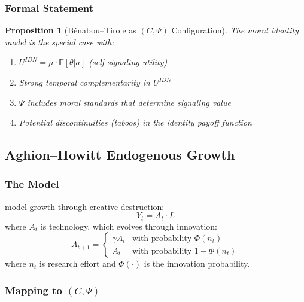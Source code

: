 \documentclass[12pt,a4paper]{article}
\newtheorem{proposition}[theorem]{Proposition}
\begin{document}
\subsubsection{Formal Statement}

\begin{proposition}[Bénabou--Tirole as $(C, \Psi)$ Configuration]
The moral identity model is the special case with:
\begin{enumerate}
  \item $U^{IDN} = \mu \cdot \mathbb{E}[\theta | a]$ (self-signaling utility)
  \item Strong temporal complementarity in $U^{IDN}$
  \item $\Psi$ includes moral standards that determine signaling value
  \item Potential discontinuities (taboos) in the identity payoff function
\end{enumerate}
\end{proposition}

\subsection{Aghion--Howitt Endogenous Growth}
\label{app:aghionhowitt}

\subsubsection{The Model}

\citet{aghionhowitt} model growth through creative destruction:
\begin{equation}
  Y_t = A_t \cdot L
  \label{eq:ahproduction}
\end{equation}
where $A_t$ is technology, which evolves through innovation:
\begin{equation}
  A_{t+1} = \begin{cases}
    \gamma A_t & \text{with probability } \Phi(n_t) \\
    A_t & \text{with probability } 1 - \Phi(n_t)
  \end{cases}
\end{equation}
where $n_t$ is research effort and $\Phi(\cdot)$ is the innovation probability.

\subsubsection{Mapping to $(C, \Psi)$}
\end{document}
